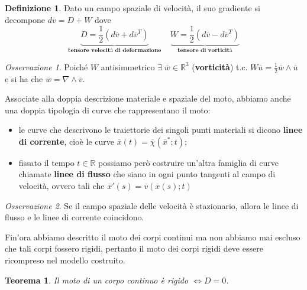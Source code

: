 \documentclass{book}
\theoremstyle{plain}
\newtheorem{teo}{Teorema}[chapter]
\theoremstyle{plain}
\theoremstyle{plain}
\theoremstyle{plain}
\theoremstyle{plain}
\theoremstyle{definition}
\newtheorem{defi}{Definizione}[chapter]
\theoremstyle{remark}
\newtheorem*{oss}{Osservazione}
\theoremstyle{definition}
\begin{document}
\begin{defi}
    Dato un campo spaziale di velocità, il suo gradiente si decompone $d\overline{v}=D+W$ dove
    \begin{displaymath}
        \underbrace{D=\frac{1}{2}(d\overline{v}+d\overline{v}^T)}_{\textbf{tensore velocità di deformazione}} \ \ \ \ \ \underbrace{W=\frac{1}{2}(d\overline{v}-d\overline{v}^T)}_{\textbf{tensore di vorticità}}
    \end{displaymath}
\end{defi}

\begin{oss}
    Poiché $W$ antisimmetrico $\exists\;\overline{w}\in \mathbb{R}^3$ (\textbf{vorticità}) t.c. $W\overline{u}=\frac{1}{2}\overline{w}\wedge\overline{u}$ e si ha che $\overline{w}=\nabla\wedge\overline{v}$.
\end{oss}

\noindent Associate alla doppia descrizione materiale e spaziale del moto, abbiamo anche una doppia tipologia di curve che rappresentano il moto:
\begin{itemize}
    \item le curve che descrivono le traiettorie dei singoli punti materiali si dicono \textbf{linee di corrente}, cioè le curve $\overline{x}(t)=\overline{\chi}(\overline{x}^*;t)$;
    \item fissato il tempo $t\in\mathbb{R}$ possiamo però costruire un'altra famiglia di curve chiamate \textbf{linee di flusso} che siano in ogni punto tangenti al campo di velocità, ovvero tali che $\overline{x}'(s)=\overline{v}(\overline{x}(s);t)$
\end{itemize}

\begin{oss}
    Se il campo spaziale delle velocità è stazionario, allora le linee di flusso e le linee di corrente coincidono.
\end{oss}

\noindent Fin'ora abbiamo descritto il moto dei corpi continui ma non abbiamo mai escluso che tali corpi fossero rigidi, pertanto il moto dei corpi rigidi deve essere ricompreso nel modello costruito.

\begin{teo}
    Il moto di un corpo continuo è rigido $\iff D=0$.
\end{teo}
\end{document}
